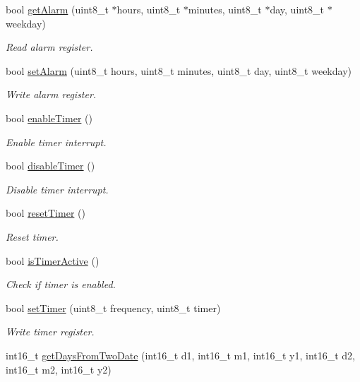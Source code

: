 \begin{DoxyCompactItemize}
bool \hyperlink{namespacePcf8563_a687f6854cf03080456bdd8596c1c60ff}{get\+Alarm} (uint8\+\_\+t $\ast$hours, uint8\+\_\+t $\ast$minutes, uint8\+\_\+t $\ast$day, uint8\+\_\+t $\ast$weekday)
\begin{DoxyCompactList}\small\item\em Read alarm register. \end{DoxyCompactList}\item 
bool \hyperlink{namespacePcf8563_ad82df13e3625c1b975f2cc2e7e356f0e}{set\+Alarm} (uint8\+\_\+t hours, uint8\+\_\+t minutes, uint8\+\_\+t day, uint8\+\_\+t weekday)
\begin{DoxyCompactList}\small\item\em Write alarm register. \end{DoxyCompactList}\item 
bool \hyperlink{namespacePcf8563_af4cc94d1ea73bbff5d44e1b716111cdb}{enable\+Timer} ()
\begin{DoxyCompactList}\small\item\em Enable timer interrupt. \end{DoxyCompactList}\item 
bool \hyperlink{namespacePcf8563_ac2c3ca7f3a13516c6549bfc0f6527c6a}{disable\+Timer} ()
\begin{DoxyCompactList}\small\item\em Disable timer interrupt. \end{DoxyCompactList}\item 
bool \hyperlink{namespacePcf8563_a6fd0509d12fd312b5dbed8506b9315c9}{reset\+Timer} ()
\begin{DoxyCompactList}\small\item\em Reset timer. \end{DoxyCompactList}\item 
bool \hyperlink{namespacePcf8563_aab079fef811171abcba7e80b8595a8d1}{is\+Timer\+Active} ()
\begin{DoxyCompactList}\small\item\em Check if timer is enabled. \end{DoxyCompactList}\item 
bool \hyperlink{namespacePcf8563_a338898a456015e796d48b82738d5a8c4}{set\+Timer} (uint8\+\_\+t frequency, uint8\+\_\+t timer)
\begin{DoxyCompactList}\small\item\em Write timer register. \end{DoxyCompactList}\item 
int16\+\_\+t \hyperlink{namespacePcf8563_a7ffd9819a4946feda4117a90ef176ab9}{get\+Days\+From\+Two\+Date} (int16\+\_\+t d1, int16\+\_\+t m1, int16\+\_\+t y1, int16\+\_\+t d2, int16\+\_\+t m2, int16\+\_\+t y2)

\end{DoxyCompactItemize}

